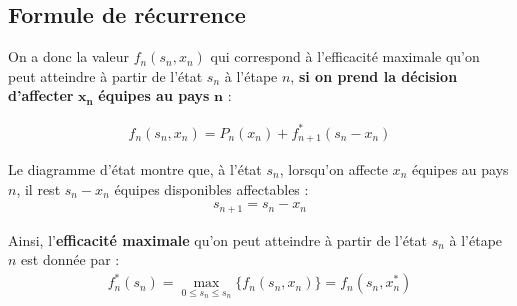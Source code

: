 \documentclass{report}
\begin{document}
\begin{multicols*}{2}
\begin{figure}[H]
\end{figure}



\subsection{Formule de récurrence}
On a donc la valeur $f_n(s_n, x_n)$ qui correspond à l'efficacité 
maximale qu'on peut atteindre à partir de l'état $s_n$ à l'étape 
$n$, \textbf{si on prend la décision d'affecter} $\boldsymbol{x_n}$
\textbf{équipes au pays} $\boldsymbol{n}$  :

\begin{align*}
    f_n(s_n, x_n) = P_n(x_n) + f^{*}_{n+1}(s_n - x_n)
\end{align*}

\begin{note}{}{}
    Le diagramme d'état montre que, à l'état $s_n$, lorsqu'on affecte $x_n$ équipes
    au pays $n$, il rest $s_n - x_n$ équipes disponibles affectables :
    \begin{align*}
        s_{n+1} = s_n - x_n 
    \end{align*}
    
\end{note}



Ainsi, l'\textbf{efficacité maximale} qu'on peut atteindre 
à partir de l'état $s_n$ à l'étape $n$ est donnée par :
\begin{align*}
    f_n^{*}(s_n) = \max_{0 \leq s_n \leq s_n} 
    \bigl\{f_n(s_n, x_n)\bigr\} = f_n(s_n, x^{*}_n) 
\end{align*}


\end{multicols*}
\end{document}
